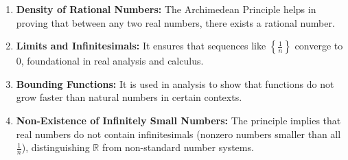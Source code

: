 \begin{enumerate}
	\item \textbf{Density of Rational Numbers:} The Archimedean Principle helps in proving that between any two real numbers, there exists a rational number.

	\item \textbf{Limits and Infinitesimals:} It ensures that sequences like \( \left\{ \frac{1}{n} \right\} \) converge to 0, foundational in real analysis and calculus.

	\item \textbf{Bounding Functions:} It is used in analysis to show that functions do not grow faster than natural numbers in certain contexts.

	\item \textbf{Non-Existence of Infinitely Small Numbers:} The principle implies that real numbers do not contain infinitesimals (nonzero numbers smaller than all \( \frac{1}{n} \)), distinguishing \( \mathbb{R} \) from non-standard number systems.
\end{enumerate}

\newpage
